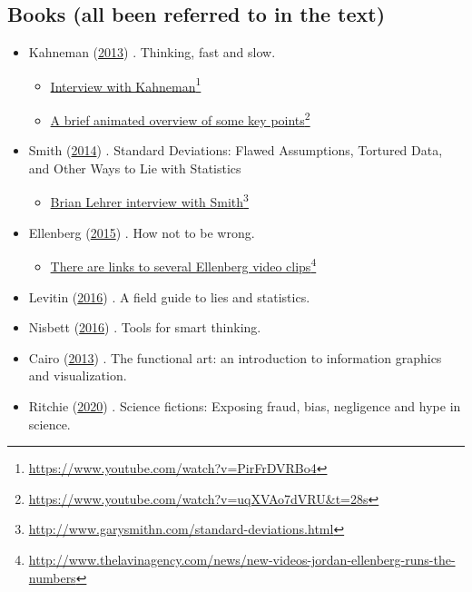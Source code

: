 \documentclass[
  10ptls,
  b5paper]{book}
\providecommand{\tightlist}{%
  \setlength{\itemsep}{0pt}\setlength{\parskip}{0pt}}
\begin{document}
\hypertarget{books-all-been-referred-to-in-the-text}{%
\subsection{Books (all been referred to in the text)}\label{books-all-been-referred-to-in-the-text}}

\begin{itemize}
\tightlist
\item
  Kahneman (\protect\hyperlink{ref-kahneman_2013}{2013}) . Thinking, fast and slow.

  \begin{itemize}
  \tightlist
  \item
    \href{https://www.youtube.com/watch?v=PirFrDVRBo4}{Interview with Kahneman}\footnote{\url{https://www.youtube.com/watch?v=PirFrDVRBo4}}
  \item
    \href{https://www.youtube.com/watch?v=uqXVAo7dVRU\&t=28s}{A brief animated overview of some key points}\footnote{\url{https://www.youtube.com/watch?v=uqXVAo7dVRU\&t=28s}}
  \end{itemize}
\item
  Smith (\protect\hyperlink{ref-smith-sd}{2014}) . Standard Deviations: Flawed Assumptions, Tortured Data, and Other Ways to Lie with Statistics

  \begin{itemize}
  \tightlist
  \item
    \href{http://www.garysmithn.com/standard-deviations.html}{Brian Lehrer interview with Smith}\footnote{\url{http://www.garysmithn.com/standard-deviations.html}}
  \end{itemize}
\item
  Ellenberg (\protect\hyperlink{ref-ellenberg_2015}{2015}) . How not to be wrong.

  \begin{itemize}
  \tightlist
  \item
    \href{http://www.thelavinagency.com/news/new-videos-jordan-ellenberg-runs-the-numbers}{There are links to several Ellenberg video clips}\footnote{\url{http://www.thelavinagency.com/news/new-videos-jordan-ellenberg-runs-the-numbers}}
  \end{itemize}
\item
  Levitin (\protect\hyperlink{ref-levitin_2016}{2016}) . A field guide to lies and statistics.
\item
  Nisbett (\protect\hyperlink{ref-nisbett}{2016}) . Tools for smart thinking.
\item
  Cairo (\protect\hyperlink{ref-cairo_2013}{2013}) . The functional art: an introduction to information
  graphics and visualization.
\item
  Ritchie (\protect\hyperlink{ref-ritchie2020science}{2020}) . Science fictions: Exposing fraud, bias,
  negligence and hype in science.
\end{itemize}
\end{document}
